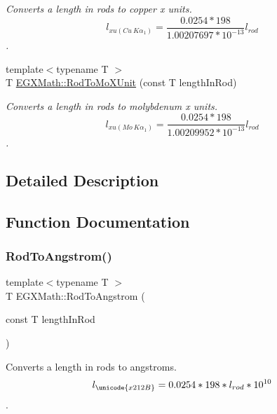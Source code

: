 \begin{DoxyCompactItemize}
\begin{DoxyCompactList}\small\item\em Converts a length in rods to copper x units. \[ l_{xu(Cu\ K\alpha_1)}=\frac{0.0254 * 198}{1.00207697*10^{-13}} l_{rod}\]. \end{DoxyCompactList}\item 
{\footnotesize template$<$typename T $>$ }\\T \mbox{\hyperlink{group___e_g_x_math-_conversions-_length_conversions-_imperial-_rod-_non-_s_i_gac5c3c27eea891ef32353d16c6b8c57ab}{E\+G\+X\+Math\+::\+Rod\+To\+Mo\+X\+Unit}} (const T length\+In\+Rod)
\begin{DoxyCompactList}\small\item\em Converts a length in rods to molybdenum x units. \[ l_{xu(Mo\ K\alpha_1)}=\frac{0.0254 * 198}{1.00209952*10^{-13}} l_{rod}\]. \end{DoxyCompactList}\end{DoxyCompactItemize}


\subsection{Detailed Description}


\subsection{Function Documentation}
\mbox{\label{group___e_g_x_math-_conversions-_length_conversions-_imperial-_rod-_non-_s_i_ga079b9122c8747685d7057ec05fefdb7f}} 
\subsubsection{\texorpdfstring{Rod\+To\+Angstrom()}{RodToAngstrom()}}
{\footnotesize\ttfamily template$<$typename T $>$ \\
T E\+G\+X\+Math\+::\+Rod\+To\+Angstrom (\begin{DoxyParamCaption}\item[{const T}]{length\+In\+Rod }\end{DoxyParamCaption})}



Converts a length in rods to angstroms. \[ l_{\unicode{x212B}}=0.0254 * 198 * l_{rod} * 10^{10} \]. 

